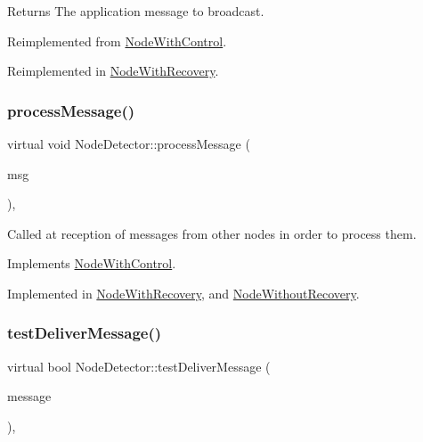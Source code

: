 \begin{DoxyReturn}{Returns}
The application message to broadcast. 
\end{DoxyReturn}


Reimplemented from \hyperlink{class_node_with_control_ab871014cf3f42d834f8d34ad5498174c}{Node\+With\+Control}.



Reimplemented in \hyperlink{class_node_with_recovery_a33d8e8775fd69cb647b38a54b36e1ebe}{Node\+With\+Recovery}.

\mbox{\label{class_node_detector_ab69432c6d3327a684845ec231826727e}} 
\subsubsection{\texorpdfstring{process\+Message()}{processMessage()}}
{\footnotesize\ttfamily virtual void Node\+Detector\+::process\+Message (\begin{DoxyParamCaption}\item[{c\+Message $\ast$}]{msg }\end{DoxyParamCaption})\hspace{0.3cm}{\ttfamily [protected]}, {}}



Called at reception of messages from other nodes in order to process them. 



Implements \hyperlink{class_node_with_control_af532082fab76c38d8c50ca90e991f4c3}{Node\+With\+Control}.



Implemented in \hyperlink{class_node_with_recovery_a216c29d76ddb0e94cd5701ff208c7f5b}{Node\+With\+Recovery}, and \hyperlink{class_node_without_recovery_a0b44132b4ebc650399711766cb050399}{Node\+Without\+Recovery}.

\mbox{\label{class_node_detector_a51e7dccd54e94bbe937752ca39dfdba4}} 
\subsubsection{\texorpdfstring{test\+Deliver\+Message()}{testDeliverMessage()}}
{\footnotesize\ttfamily virtual bool Node\+Detector\+::test\+Deliver\+Message (\begin{DoxyParamCaption}\item[{const \hyperlink{structures_8h_a7e7bdc1d2fff8a9436f2f352b2711ed6}{message\+Info} \&}]{message }\end{DoxyParamCaption})\hspace{0.3cm}{\ttfamily [protected]}, {}}



